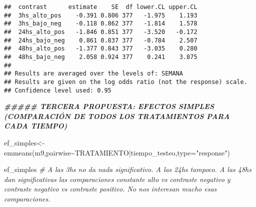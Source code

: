 \documentclass[
]{article}
\newenvironment{Shaded}{\begin{snugshade}}{\end{snugshade}}
\newcommand{\AttributeTok}[1]{\textcolor[rgb]{0.77,0.63,0.00}{#1}}
\newcommand{\CommentTok}[1]{\textcolor[rgb]{0.56,0.35,0.01}{\textit{#1}}}
\newcommand{\DocumentationTok}[1]{\textcolor[rgb]{0.56,0.35,0.01}{\textbf{\textit{#1}}}}
\newcommand{\FunctionTok}[1]{\textcolor[rgb]{0.00,0.00,0.00}{#1}}
\newcommand{\NormalTok}[1]{#1}
\newcommand{\OtherTok}[1]{\textcolor[rgb]{0.56,0.35,0.01}{#1}}
\newcommand{\SpecialCharTok}[1]{\textcolor[rgb]{0.00,0.00,0.00}{#1}}
\newcommand{\StringTok}[1]{\textcolor[rgb]{0.31,0.60,0.02}{#1}}
\begin{document}
\begin{verbatim}
##  contrast      estimate    SE  df lower.CL upper.CL
##  3hs_alto_pos    -0.391 0.806 377   -1.975    1.193
##  3hs_bajo_neg    -0.118 0.862 377   -1.814    1.578
##  24hs_alto_pos   -1.846 0.851 377   -3.520   -0.172
##  24hs_bajo_neg    0.861 0.837 377   -0.784    2.507
##  48hs_alto_pos   -1.377 0.843 377   -3.035    0.280
##  48hs_bajo_neg    2.058 0.924 377    0.241    3.875
## 
## Results are averaged over the levels of: SEMANA 
## Results are given on the log odds ratio (not the response) scale. 
## Confidence level used: 0.95
\end{verbatim}

\begin{Shaded}
\begin{Highlighting}[]
\DocumentationTok{\#\#\#\#\# TERCERA PROPUESTA: EFECTOS SIMPLES (COMPARACIÓN DE TODOS LOS TRATAMIENTOS PARA CADA TIEMPO)}

\NormalTok{ef\_simples}\OtherTok{\textless{}{-}}\FunctionTok{emmeans}\NormalTok{(m9,pairwise}\SpecialCharTok{\textasciitilde{}}\NormalTok{TRATAMIENTO}\SpecialCharTok{|}\NormalTok{tiempo\_testeo,}\AttributeTok{type=}\StringTok{"response"}\NormalTok{)}

\NormalTok{ef\_simples }\CommentTok{\# A las 3hs no da nada significativo. A las 24hs tampoco. A las 48hs dan significativas las comparaciones constante alto vs contraste negativo y contraste negativo vs contraste positivo. No nos interesan mucho esas comparaciones.}
\end{Highlighting}
\end{Shaded}
\end{document}
